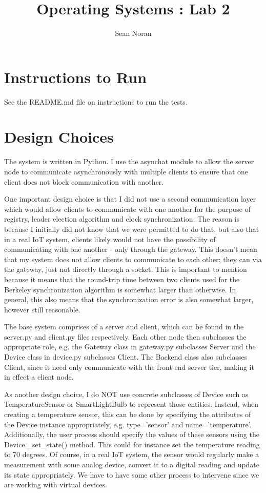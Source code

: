 \documentclass[]{article}
\title{Operating Systems : Lab 2}
\author{Sean Noran}
\begin{document}
\maketitle

\onehalfspacing

\section{Instructions to Run}

See the README.md file on instructions to run the tests.

\section{Design Choices}

The system is written in Python. I use the asynchat module to allow the server node to communicate asynchronously with multiple clients to ensure that one client does not block communication with another.

One important design choice is that I did not use a second communication layer which would allow clients to communicate with one another for the purpose of registry, leader election algorithm and clock synchronization. The reason is because I initially did not know that we were permitted to do that, but also that in a real IoT system, clients likely would not have the possibility of communicating with one another - only through the gateway. This doesn't mean that my system does not allow clients to communicate to each other; they can via the gateway, just not directly through a socket. This is important to mention because it means that the round-trip time between two clients used for the Berkeley synchronization algorithm is somewhat larger than otherwise. In general, this also means that the synchronization error is also somewhat larger, however still reasonable.

The base system comprises of a server and client, which can be found in the server.py and client.py files respectively. Each other node then subclasses the appropriate role, e.g. the Gateway class in gateway.py subclasses Server and the Device class in device.py subclasses Client. The Backend class also subclasses Client, since it need only communicate with the front-end server tier, making it in effect a client node.

As another design choice, I do NOT use concrete subclasses of Device such as TemperatureSensor or SmartLightBulb to represent those entities. Instead, when creating a temperature sensor, this can be done by specifying the attributes of the Device instance appropriately, e.g. type='sensor' and name='temperature'. Additionally, the user process should specify the values of these sensors using the Device.\_set\_state() method. This could for instance set the temperature reading to 70 degrees. Of course, in a real IoT system, the sensor would regularly make a measurement with some analog device,  convert it to a digital reading and update its state appropriately. We have to have some other process to intervene since we are working with virtual devices.
\end{document}
